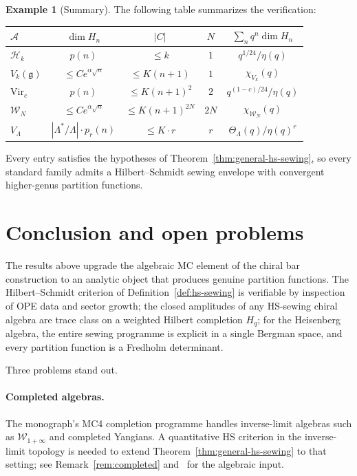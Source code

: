 \documentclass[11pt,reqno]{amsart}
\theoremstyle{definition}
\newtheorem{example}[theorem]{Example}
\theoremstyle{remark}
\newcommand{\cA}{\mathcal{A}}
\newcommand{\cH}{\mathcal{H}}
\newcommand{\cW}{\mathcal{W}}
\newcommand{\Vir}{\mathrm{Vir}}
\newcommand{\fg}{\mathfrak{g}}
\numberwithin{equation}{section}
\begin{document}
\begin{example}[Summary]\label{ex:summary}
The following table summarizes the verification:
\begin{center}
\begin{tabular}{l|ccc|c}
$\cA$ & $\dim H_n$ & $|C|$ & $N$ & $\sum_n q^n\dim H_n$ \\ \hline
$\cH_k$ & $p(n)$ & $\leq k$ & $1$
& $q^{1/24}/\eta(q)$ \\
$V_k(\fg)$ & $\leq Ce^{\alpha\sqrt n}$
& $\leq K(n+1)$ & $1$ & $\chi_{V_k}(q)$ \\
$\Vir_c$ & $p(n)$
& $\leq K(n+1)^2$ & $2$
& $q^{(1-c)/24}/\eta(q)$ \\
$\cW_N$ & $\leq Ce^{\alpha\sqrt n}$
& $\leq K(n+1)^{2N}$ & $2N$
& $\chi_{\cW_N}(q)$ \\
$V_\Lambda$ & $|\Lambda^*/\Lambda|\cdot p_r(n)$
& $\leq K \cdot r$ & $r$
& $\Theta_\Lambda(q)/\eta(q)^r$
\end{tabular}
\end{center}
Every entry satisfies the hypotheses of
Theorem~\ref{thm:general-hs-sewing}, so every standard family
admits a Hilbert--Schmidt sewing envelope with convergent
higher-genus partition functions.
\end{example}


\section{Conclusion and open problems}\label{sec:conclusion}

The results above upgrade the algebraic MC element of the chiral
bar construction to an analytic object that produces genuine
partition functions. The Hilbert--Schmidt criterion of
Definition~\ref{def:hs-sewing} is verifiable by inspection of OPE
data and sector growth; the closed amplitudes of any HS-sewing
chiral algebra are trace class on a weighted Hilbert completion
$H_q$; for the Heisenberg algebra, the entire sewing programme
is explicit in a single Bergman space, and every partition
function is a Fredholm determinant.

Three problems stand out.

\paragraph{Completed algebras.}
The monograph's MC4 completion programme handles inverse-limit
algebras such as $\cW_{1+\infty}$ and completed Yangians. A
quantitative HS criterion in the inverse-limit topology is needed
to extend Theorem~\ref{thm:general-hs-sewing} to that setting;
see Remark~\ref{rem:completed} and~\cite{LorgatVolI} for the
algebraic input.
\end{document}
